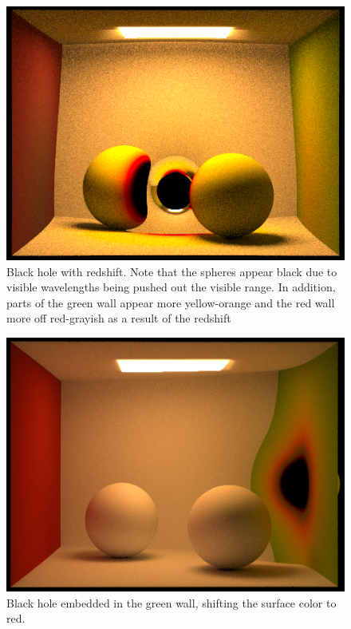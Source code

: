 \documentclass[sigconf]{acmart}
\begin{document}
\begin{figure}[h]
  \centering
  \includegraphics[width=\linewidth]{CBspheres_lambertian_screenshot_4-28_20-52-32.png}
  \caption{Black hole with redshift.  Note that the spheres appear black due to visible wavelengths being pushed out the visible range.  In addition, parts of the green wall appear more yellow-orange and the red wall more off red-grayish as a result of the redshift}
  \Description{}
\end{figure}

\begin{figure}[h]
  \centering
  \includegraphics[width=\linewidth]{sphereright.png}
  \caption{Black hole embedded in the green wall, shifting the surface color to red.}
  \Description{}
\end{figure}
\end{document}
